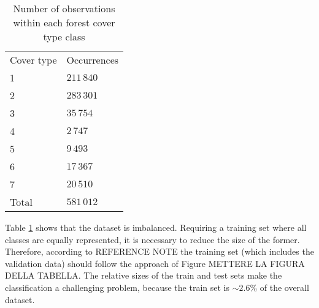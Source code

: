 \begin{table}[]
\centering
	\begin{tabular}{ll}
		Cover type & Occurrences \\
		1          & $211\,840$      \\
		2          & $283\,301$      \\
		3          & $35\,754$       \\
		4          & $2\,747$        \\
		5          & $9\,493$       \\
		6          & $17\,367$      \\
		7          & $20\,510$       \\
		Total      & $581\,012$     
	\end{tabular}
\caption{Number of observations within each forest cover type class}
\label{tab:covertypes}
\end{table}
Table \ref{tab:covertypes} shows that the dataset is imbalanced. Requiring a training set where all classes are equally represented, it is necessary to reduce the size of the former. Therefore, according to REFERENCE NOTE the training set (which includes the validation data) should follow the approach of Figure METTERE LA FIGURA DELLA TABELLA. The relative sizes of the train and test sets make the classification a challenging problem, because the train set is $\sim2.6\%$ of the overall dataset.
